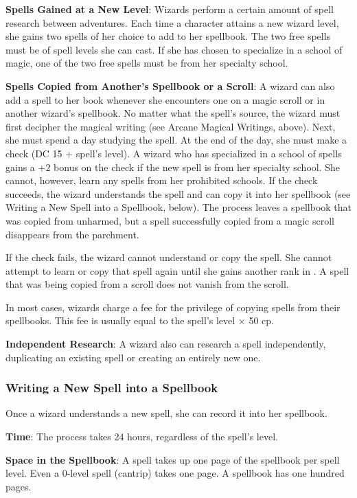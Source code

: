 \textbf{Spells Gained at a New Level}: Wizards perform a certain amount of spell research between adventures. Each time a character attains a new wizard level, she gains two spells of her choice to add to her spellbook. The two free spells must be of spell levels she can cast. If she has chosen to specialize in a school of magic, one of the two free spells must be from her specialty school.

\textbf{Spells Copied from Another's Spellbook or a Scroll}: A wizard can also add a spell to her book whenever she encounters one on a magic scroll or in another wizard's spellbook. No matter what the spell's source, the wizard must first decipher the magical writing (see Arcane Magical Writings, above). Next, she must spend a day studying the spell. At the end of the day, she must make a  check (DC 15 + spell's level). A wizard who has specialized in a school of spells gains a +2 bonus on the  check if the new spell is from her specialty school. She cannot, however, learn any spells from her prohibited schools. If the check succeeds, the wizard understands the spell and can copy it into her spellbook (see Writing a New Spell into a Spellbook, below). The process leaves a spellbook that was copied from unharmed, but a spell successfully copied from a magic scroll disappears from the parchment.

If the check fails, the wizard cannot understand or copy the spell. She cannot attempt to learn or copy that spell again until she gains another rank in . A spell that was being copied from a scroll does not vanish from the scroll.

In most cases, wizards charge a fee for the privilege of copying spells from their spellbooks. This fee is usually equal to the spell's level $\times$ 50 cp.

\textbf{Independent Research}: A wizard also can research a spell independently, duplicating an existing spell or creating an entirely new one.

\subsubsection{Writing a New Spell into a Spellbook}
Once a wizard understands a new spell, she can record it into her spellbook.

\textbf{Time}: The process takes 24 hours, regardless of the spell's level.

\textbf{Space in the Spellbook}: A spell takes up one page of the spellbook per spell level. Even a 0-level spell (cantrip) takes one page. A spellbook has one hundred pages.

